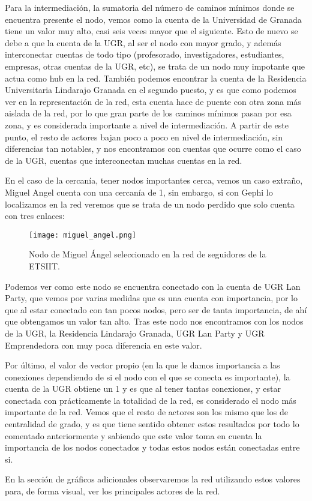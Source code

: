 Para la intermediación, la sumatoria del número de caminos mínimos donde se encuentra presente el nodo, vemos como la cuenta de la Universidad de Granada tiene un valor muy alto, casi seis veces mayor que el siguiente. Esto de nuevo se debe a que la cuenta de la UGR, al ser el nodo con mayor grado, y además interconectar cuentas de todo tipo (profesorado, investigadores, estudiantes, empresas, otras cuentas de la UGR, etc), se trata de un nodo muy impotante que actua como hub en la red. También podemos encontrar la cuenta de la Residencia Universitaria Lindarajo Granada en el segundo puesto, y es que como podemos ver en la representación de la red, esta cuenta hace de puente con otra zona más aislada de la red, por lo que gran parte de los caminos mínimos pasan por esa zona, y es considerada importante a nivel de intermediación. A partir de este punto, el resto de actores bajan poco a poco en nivel de intermediación, sin diferencias tan notables, y nos encontramos con cuentas que ocurre como el caso de la UGR, cuentas que interconectan muchas cuentas en la red.

En el caso de la cercanía, tener nodos importantes cerca, vemos un caso extraño, Miguel Angel cuenta con una cercanía de 1, sin embargo, si con Gephi lo localizamos en la red veremos que se trata de un nodo perdido que solo cuenta con tres enlaces:

\begin{figure}[H]
  \centering
  \texttt{[image: miguel\_angel.png]}
  \caption{Nodo de Miguel Ángel seleccionado en la red de seguidores de la ETSIIT.}
  \label{fig:miguel_angel}
\end{figure}

Podemos ver como este nodo se encuentra conectado con la cuenta de UGR Lan Party, que vemos por varias medidas que es una cuenta con importancia, por lo que al estar conectado con tan pocos nodos, pero ser de tanta importancia, de ahí que obtengamos un valor tan alto. Tras este nodo nos encontramos con los nodos de la UGR, la Residencia Lindarajo Granada, UGR Lan Party y UGR Emprendedora con muy poca diferencia en este valor.

Por último, el valor de vector propio (en la que le damos importancia a las conexiones dependiendo de si el nodo con el que se conecta es importante), la cuenta de la UGR obtiene un 1 y es que al tener tantas conexiones, y estar conectada con prácticamente la totalidad de la red, es considerado el nodo más importante de la red. Vemos que el resto de actores son los mismo que los de centralidad de grado, y es que tiene sentido obtener estos resultados por todo lo comentado anteriormente y sabiendo que este valor toma en cuenta la importancia de los nodos conectados y todas estos nodos están conectadas entre si.

En la sección de gráficos adicionales observaremos la red utilizando estos valores para, de forma visual, ver los principales actores de la red.
